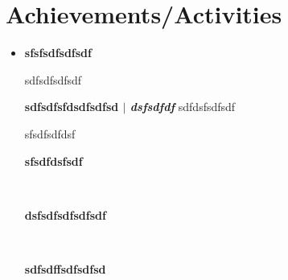 \documentclass[letterpaper,5pt]{article}
\begin{document}
    
    
          \section{Achievements/Activities}
          \begin{itemize}[leftmargin=0.15in, label={}]
          \item[]
          
            \textbf{sfsfsdfsdfsdf  \emph{} } \hfill{}

                \hspace{0.15in}
                \textbullet{} sdfsdfsdfsdf 
                \newline

                \vspace{-10pt} 
                
            \textbf{sdfsdfsfdsdfsdfsd $|$ \emph{dsfsdfdf} } \hfill{sdfdsfsdfsdf}

                \hspace{0.15in}
                \textbullet{} sfsdfsdfdsf 
                \newline

                \vspace{-10pt} 
                
            \textbf{sfsdfdsfsdf  \emph{} } \hfill{}

                \hspace{0.15in}
                \ 
                \newline

                \vspace{-10pt} 
                
            \textbf{dsfsdfsdfsdfsdf  \emph{} } \hfill{}

                \hspace{0.15in}
                \ 
                \newline

                \vspace{-10pt} 
                
            \textbf{sdfsdffsdfsdfsd  \emph{} } \hfill{}

                \hspace{0.15in}
                \ 
                \newline

                \vspace{-10pt} 
                
                
            \end{itemize}
          
      
\end{document}
